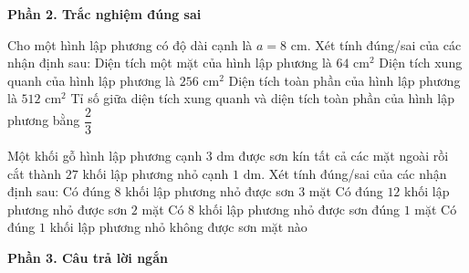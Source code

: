 \textbf{Phần 2. Trắc nghiệm đúng sai}

\begin{ex} %
Cho một hình lập phương có độ dài cạnh là $a = 8\text{ cm}$. Xét tính đúng/sai của các nhận định sau:
\choiceTF
{\True Diện tích một mặt của hình lập phương là $64\text{ cm}^2$}
{\True Diện tích xung quanh của hình lập phương là $256\text{ cm}^2$}
{Diện tích toàn phần của hình lập phương là $512\text{ cm}^2$}
{\True Tỉ số giữa diện tích xung quanh và diện tích toàn phần của hình lập phương bằng $\dfrac{2}{3}$}
\end{ex}

\begin{ex} %
Một khối gỗ hình lập phương cạnh $3\text{ dm}$ được sơn kín tất cả các mặt ngoài rồi cắt thành $27$ khối lập phương nhỏ cạnh $1\text{ dm}$. Xét tính đúng/sai của các nhận định sau:
\choiceTF
{\True Có đúng $8$ khối lập phương nhỏ được sơn $3$ mặt}
{\True Có đúng $12$ khối lập phương nhỏ được sơn $2$ mặt}
{Có $8$ khối lập phương nhỏ được sơn đúng $1$ mặt}
{\True Có đúng $1$ khối lập phương nhỏ không được sơn mặt nào}
\end{ex}

\textbf{Phần 3. Câu trả lời ngắn}

